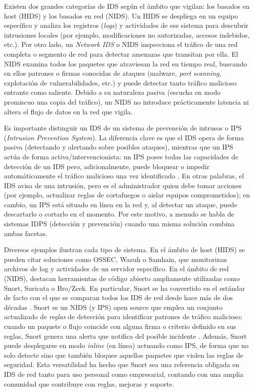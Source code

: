 \documentclass[11pt,a4paper,twoside]{report}
\begin{document}
Existen dos grandes categorías de IDS según el ámbito que vigilan: los basados en host (HIDS) y los basados en red (NIDS). Un HIDS se despliega en un equipo específico y analiza los registros (\textit{logs}) y actividades de ese sistema para descubrir intrusiones locales (por ejemplo, modificaciones no autorizadas, accesos indebidos, etc.). Por otro lado, un \textit{Network IDS} o NIDS inspecciona el tráfico de una red completa o segmento de red para detectar amenazas que transitan por ella. El NIDS examina todos los paquetes que atraviesan la red en tiempo real, buscando en ellos patrones o firmas conocidas de ataques (malware, \textit{port scanning}, explotación de vulnerabilidades, etc.) y puede detectar tanto tráfico malicioso entrante como saliente. Debido a su naturaleza pasiva (escucha en modo promiscuo una copia del tráfico), un NIDS no introduce prácticamente latencia ni altera el flujo de datos en la red que vigila.\newline

Es importante distinguir un IDS de un sistema de prevención de intrusos o IPS (\textit{Intrusion Prevention System}). La diferencia clave es que el IDS opera de forma pasiva (detectando y alertando sobre posibles ataques), mientras que un IPS actúa de forma activa/intervencionista: un IPS posee todas las capacidades de detección de un IDS pero, adicionalmente, puede bloquear o impedir automáticamente el tráfico malicioso una vez identificado \cite{a2secure2019}. En otras palabras, el IDS avisa de una intrusión, pero es el administrador quien debe tomar acciones (por ejemplo, actualizar reglas de cortafuegos o aislar equipos comprometidos); en cambio, un IPS está situado en línea en la red y, al detectar un ataque, puede descartarlo o cortarlo en el momento. Por este motivo, a menudo se habla de sistemas IDPS (detección y prevención) cuando una misma solución combina ambas facetas.\newline

Diversos ejemplos ilustran cada tipo de sistema. En el ámbito de host (HIDS) se pueden citar soluciones como OSSEC, Wazuh o Samhain, que monitorizan archivos de log y actividades de un servidor específico. En el ámbito de red (NIDS), destacan herramientas de código abierto ampliamente utilizadas como Snort, Suricata o Bro/Zeek. En particular, Snort se ha convertido en el estándar de facto con el que se comparan todos los IDS de red desde hace más de dos décadas \cite{SnortBlog2011}. Snort es un NIDS (y IPS) open source que emplea un conjunto actualizado de \textit{reglas} de detección para identificar patrones de tráfico malicioso; cuando un paquete o flujo coincide con alguna firma o criterio definido en sus reglas, Snort genera una alerta que notifica del posible incidente \cite{CiscoSnort3Blog}. Además, Snort puede desplegarse en modo \textit{inline} (en línea) actuando como IPS, de forma que no solo detecte sino que también bloquee aquellos paquetes que violen las reglas de seguridad. Esta versatilidad ha hecho que Snort sea una referencia obligada en IDS de red tanto para uso personal como empresarial, contando con una amplia comunidad que contribuye con reglas, mejoras y soporte.\newline
\end{document}
